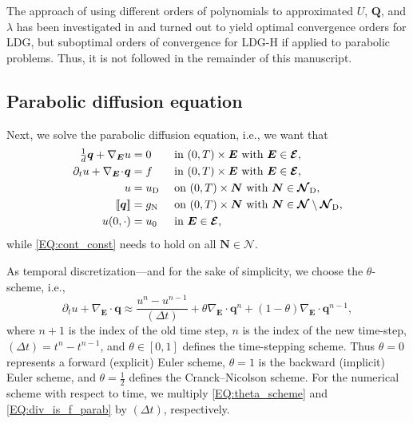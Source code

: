 \documentclass[a4paper, english, 12pt, reqno, draft]{amsart}
\theoremstyle{definition}
\theoremstyle{remark}
\numberwithin{equation}{section}
\newcommand{\SetEdge}{\ensuremath{\boldsymbol{\mathcal E}}}
\newcommand{\SetNode}{\ensuremath{\boldsymbol{\mathcal N}}}
\newcommand{\SetNodeDir}{\ensuremath{\SetNode_\textup D}}
\newcommand{\Edge}{{\ensuremath{\boldsymbol E}}}
\newcommand{\Node}{{\ensuremath{\boldsymbol N}}}
\newcommand{\Nabla}{\ensuremath{\nabla_\Edge}}
\newcommand{\Div}{\ensuremath{\Nabla\!\cdot\!}}
\newcommand{\jump}[1]{{[\![ #1 ]\!]}}
\renewcommand{\vec}[1]{\ensuremath{\boldsymbol{#1}}}
\newcommand{\deltat}{\ensuremath{(\Delta t)}}
\begin{document}
The approach of using different orders of polynomials to approximated $U$, $\vec Q$, and $\lambda$ has been investigated in \cite{RuppKD2018,Rupp2019} and turned out to yield optimal convergence orders for LDG, but suboptimal orders of convergence for LDG-H if applied to parabolic problems. Thus, it is not followed in the remainder of this manuscript.
%
\subsection{Parabolic diffusion equation}\label{SEC:parabolic_diff}
% 
Next, we solve the parabolic diffusion equation, i.e., we want that
% 
\begin{subequations}\label{EQ:diffusion_parab}
\begin{align}
 \tfrac{1}{d} \vec q + \Nabla u & = 0 && \text{ in } (0,T) \times \Edge \text{ with } \Edge \in \SetEdge,\label{EQ:primal_dual_parab}\\
 \partial_t u + \Div \vec q & = f && \text{ in } (0,T) \times \Edge \text{ with } \Edge \in \SetEdge,\label{EQ:div_is_f_parab}\\
 u & = u_\textup D && \text{ on } (0,T) \times \Node \text{ with } \Node \in \SetNodeDir,\label{EQ:dir_cond_parab}\\
 \jump{\vec q} & = g_\textup N && \text{ on } (0,T) \times \Node \text{ with } \Node \in \SetNode \setminus \SetNodeDir,\label{EQ:neu_cond_parab}\\
 u(0,\cdot) & = u_0 && \text{ in } \Edge \in \SetEdge,\label{EQ:initial_parab}
\end{align}
\end{subequations}
% 
while \eqref{EQ:cont_const} needs to hold on all $\Node \in \SetNode$.

As temporal discretization---and for the sake of simplicity, we choose the $\theta$-scheme, i.e.,
% 
\begin{equation}\label{EQ:theta_scheme}
 \partial_t u + \Div \vec q \approx \frac{ u^n - u^{n-1} }{\deltat} + \theta \Div \vec q^n + (1 - \theta) \Div \vec q^{n-1},
\end{equation}
%
where $n+1$ is the index of the old time step, $n$ is the index of the new time-step, $\deltat = t^n - t^{n-1}$, and $\theta \in [0,1]$ defines the time-stepping scheme. Thus $\theta = 0$ represents a forward (explicit) Euler scheme, $\theta = 1$ is the backward (implicit) Euler scheme, and $\theta = \tfrac{1}{2}$ defines the Cranck--Nicolson scheme. For the numerical scheme with respect to time, we multiply \eqref{EQ:theta_scheme} and \eqref{EQ:div_is_f_parab} by $\deltat$, respectively.
\end{document}
